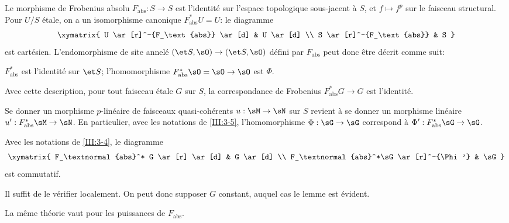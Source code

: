Le morphisme de Frobenius absolu $F_\text{abs}:S\to S$ est l'identité sur 
l'espace topologique sous-jacent à $S$, et $f\mapsto f^p$ sur le faisceau 
structural. Pour $U/S$ étale, on a un isomorphisme canonique 
$F_\text{abs}^* U=U$: le diagramme 
\[\xymatrix{
  U \ar[r]^-{F_\text{abs}} \ar[d] 
    & U \ar[d] \\
  S \ar[r]^-{F_\text{abs}} 
    & S
}\]
est cartésien. L'endomorphisme de site annelé 
$(\et S,\sO)\to(\et S,\sO)$ défini par $F_\text{abs}$ peut donc 
être décrit comme suit:
\begin{center}
  $F_\text{abs}^*$ est l'identité sur $\et S$; l'homomorphisme 
  $F_\text{abs}^*\sO=\sO\to\sO$ est $\Phi$.
\end{center}
Avec cette description, pour tout faisceau étale $G$ sur $S$, la 
correspondance de Frobenius $F_\text{abs}^*G\to G$ est l'identité. 

Se donner un morphisme $p$-linéaire de faisceaux quasi-cohérents 
$u:\sM\to\sN$ sur $S$ revient à se donner un morphisme linéaire 
$u':F_\text{abs}^*\sM\to\sN$. En particulier, avec les notations de 
\ref{III:3-5}, l'homomorphisme $\Phi:\sG\to\sG$ correspond à 
$\Phi':F_\text{abs}^*\sG\to\sG$. 





\begin{lemma_}\label{III:3-5}
Avec les notations de \ref{III:3-4}, le diagramme 
\[\xymatrix{
  F_\textnormal{abs}^* G \ar[r] \ar[d] 
    & G \ar[d] \\
  F_\textnormal{abs}^*\sG \ar[r]^-{\Phi'} 
    & \sG 
}\]
est commutatif.
\end{lemma_}

Il suffit de le vérifier localement. On peut donc supposer $G$ constant, 
auquel cas le lemme est évident. 

La même théorie vaut pour les puissances de $F_\text{abs}$.





\subsection{}\label{III:3-6}

